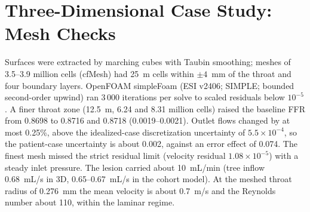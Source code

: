 \documentclass[journal,twoside,web,onecolumn]{ieeecolor}
\begin{document}
\FloatBarrier
{}
\section{Three-Dimensional Case Study: Mesh Checks}\label{sec:cfd}
Surfaces were extracted by marching cubes with Taubin smoothing; meshes of 3.5--3.9 million cells (cfMesh) had
25~\textmu m cells within $\pm 4$~mm of the throat and four boundary layers. OpenFOAM simpleFoam (ESI v2406; SIMPLE;
bounded second-order upwind) ran 3\,000 iterations per solve to scaled residuals below $10^{-5}$. A finer throat zone (12.5~\textmu m, 6.24 and 8.31 million cells) raised the baseline FFR from 0.8698 to 0.8716 and 0.8718
(0.0019--0.0021). Outlet flows changed by at most 0.25\%, above the idealized-case discretization uncertainty of $5.5\times10^{-4}$,
so the patient-case uncertainty is about 0.002, against an error effect of 0.074. The finest mesh missed the strict residual limit (velocity residual $1.08\times10^{-5}$) with a steady inlet pressure. The lesion carried about 10~mL/min (tree inflow 0.68~mL/s in 3D, 0.65--0.67~mL/s in the cohort model). At the meshed throat radius of 0.276~mm the mean velocity is about 0.7~m/s and the Reynolds number about 110, within the laminar regime.
\end{document}
